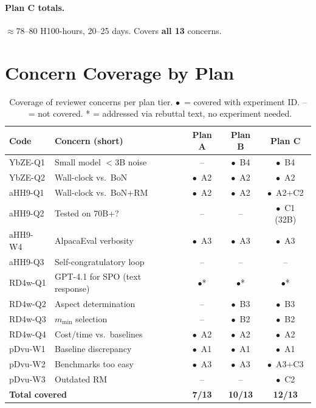 \documentclass[11pt,a4paper]{article}
\newcommand{\yes}{\textcolor{covered}{$\bullet$}}
\newcommand{\no}{\textcolor{notcovered}{--}}
\begin{document}
\paragraph{Plan C totals.} $\approx$78--80 H100-hours, 20--25 days. Covers \textbf{all 13} concerns.

\section{Concern Coverage by Plan}

\begin{table}[h!]
\centering
\renewcommand{\arraystretch}{1.4}
\begin{tabular}{llccc}
\toprule
\textbf{Code} & \textbf{Concern (short)} & \textbf{Plan A} & \textbf{Plan B} & \textbf{Plan C} \\
\midrule
YbZE-Q1 & Small model $<$3B noise         & \no  & \yes\ B4 & \yes\ B4 \\
YbZE-Q2 & Wall-clock vs.\ BoN             & \yes\ A2 & \yes\ A2 & \yes\ A2 \\
aHH9-Q1 & Wall-clock vs.\ BoN+RM          & \yes\ A2 & \yes\ A2 & \yes\ A2+C2 \\
aHH9-Q2 & Tested on 70B+?                 & \no  & \no  & \yes\ C1 (32B) \\
aHH9-W4 & AlpacaEval verbosity            & \yes\ A3 & \yes\ A3 & \yes\ A3 \\
aHH9-Q3 & Self-congratulatory loop        & \no  & \no  & \no \\
RD4w-Q1 & GPT-4.1 for SPO (text response) & \yes* & \yes* & \yes* \\
RD4w-Q2 & Aspect determination            & \no  & \yes\ B3 & \yes\ B3 \\
RD4w-Q3 & $m_{\min}$ selection            & \no  & \yes\ B2 & \yes\ B2 \\
RD4w-Q4 & Cost/time vs.\ baselines        & \yes\ A2 & \yes\ A2 & \yes\ A2 \\
pDvu-W1 & Baseline discrepancy            & \yes\ A1 & \yes\ A1 & \yes\ A1 \\
pDvu-W2 & Benchmarks too easy             & \yes\ A3 & \yes\ A3 & \yes\ A3+C3 \\
pDvu-W3 & Outdated RM                     & \no  & \no  & \yes\ C2 \\
\midrule
\multicolumn{2}{l}{\textbf{Total covered}} & \textbf{7/13} & \textbf{10/13} & \textbf{12/13} \\
\bottomrule
\end{tabular}
\caption{Coverage of reviewer concerns per plan tier. \yes\ = covered with experiment ID.
\no\ = not covered. * = addressed via rebuttal text, no experiment needed.}
\end{table}
\end{document}

